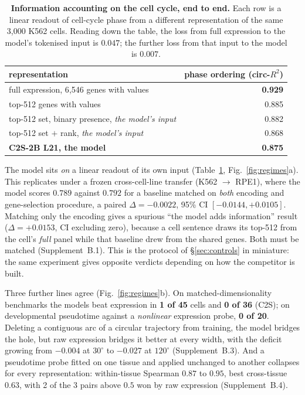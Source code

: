 \documentclass[11pt]{article}
\begin{document}
\begin{table}[h]\centering\small
\caption{\textbf{Information accounting on the cell cycle, end to end.} Each row is a linear readout of
cell-cycle phase from a different representation of the same 3{,}000 K562 cells. Reading down the
table, the loss from full expression to the model's tokenised input is $0.047$; the further loss from
that input to the model is $0.007$.}
\label{tab:accounting}
\begin{tabular}{lr}
\toprule
representation & phase ordering (circ-$R^2$) \\
\midrule
full expression, 6{,}546 genes with values & \textbf{0.929} \\
top-512 genes with values & 0.885 \\
top-512 set, binary presence, \emph{the model's input} & 0.882 \\
top-512 set $+$ rank, \emph{the model's input} & 0.868 \\
\textbf{C2S-2B L21, the model} & \textbf{0.875} \\
\bottomrule
\end{tabular}
\end{table}

The model sits \emph{on} a linear readout of its own input (Table~\ref{tab:accounting},
Fig.~\ref{fig:regimes}a). This replicates under a frozen cross-cell-line transfer (K562 $\to$ RPE1),
where the model scores $0.789$ against $0.792$ for a baseline matched on \emph{both} encoding and
gene-selection procedure, a paired $\Delta=-0.0022$, 95\% CI $[-0.0144,+0.0105]$. Matching only the
encoding gives a spurious ``the model adds information'' result ($\Delta=+0.0153$, CI excluding zero),
because a cell sentence draws its top-512 from the cell's \emph{full} panel while that baseline drew
from the shared genes. Both must be matched (Supplement~B.1). This is the protocol of
\S\ref{sec:controls} in miniature: the same experiment gives opposite verdicts depending on how the
competitor is built.

Three further lines agree (Fig.~\ref{fig:regimes}b). On matched-dimensionality benchmarks the models
beat expression in \textbf{1 of 45} cells and \textbf{0 of 36} (C2S); on developmental pseudotime
against a \emph{nonlinear} expression probe, \textbf{0 of 20}. Deleting a contiguous arc of a circular
trajectory from training, the model bridges the hole, but raw expression bridges it better at every
width, with the deficit growing from $-0.004$ at $30^\circ$ to $-0.027$ at $120^\circ$
(Supplement~B.3). And a pseudotime probe fitted on one tissue and applied unchanged to another
collapses for every representation: within-tissue Spearman $0.87$ to $0.95$, best cross-tissue $0.63$,
with 2 of the 3 pairs above $0.5$ won by raw expression (Supplement~B.4).
\end{document}
